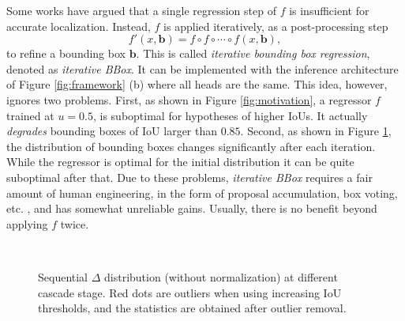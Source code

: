 \documentclass[10pt,twocolumn,letterpaper]{article}
\begin{document}
Some works \cite{DBLP:conf/iccv/GidarisK15,DBLP:conf/bmvc/GidarisK16,DBLP:conf/cvpr/HeZRS16} have argued that a single regression step of $f$ is insufficient
for accurate localization. Instead, $f$ is applied iteratively, as a
post-processing step
\begin{equation}
\label{equ:iterative bbox}
f'(x,\textbf{b})=f\circ{f}\circ\cdots\circ{f}(x,\textbf{b}),
\end{equation}
to refine a bounding box $\textbf{b}$. This is called \textit{iterative bounding
box regression}, denoted as \textit{iterative BBox}. It can be implemented
with the inference architecture of Figure \ref{fig:framework} (b) where all
heads are the same. This idea, however, ignores two problems. First, as
shown in Figure \ref{fig:motivation}, a regressor $f$ trained at $u=0.5$, is
suboptimal for hypotheses of higher IoUs. It actually {\it degrades\/}
bounding boxes of IoU larger than $0.85$. Second, as shown in
Figure \ref{fig:distribution}, the distribution of bounding boxes changes
significantly after each iteration. While the regressor is optimal for the
initial distribution it can be quite suboptimal after that. Due to these
problems, \textit{iterative BBox} requires a fair amount of human
engineering, in the form of proposal accumulation, box voting, etc. \cite{DBLP:conf/iccv/GidarisK15,DBLP:conf/bmvc/GidarisK16,DBLP:conf/cvpr/HeZRS16},
and has somewhat unreliable gains. Usually, there is no benefit beyond
applying $f$ twice.


\begin{figure}[!t]
\begin{minipage}[b]{.32\linewidth}
\centering
\centerline{}
\end{minipage}
\hfill
\begin{minipage}[b]{.32\linewidth}
\centering
\centerline{}
\end{minipage}
\hfill
\begin{minipage}[b]{.32\linewidth}
\centering
\centerline{}
\end{minipage}\\
\hfill
\begin{minipage}[b]{.32\linewidth}
\centering
\centerline{}
\end{minipage}
\hfill
\begin{minipage}[b]{.32\linewidth}
\centering
\centerline{}
\end{minipage}
\hfill
\begin{minipage}[b]{.32\linewidth}
\centering
\centerline{}
\end{minipage}
\caption{Sequential $\Delta$ distribution (without normalization) at different cascade stage. Red dots are outliers when using increasing IoU thresholds, and the statistics are obtained after outlier removal.}
\label{fig:distribution}
\end{figure}
\end{document}
